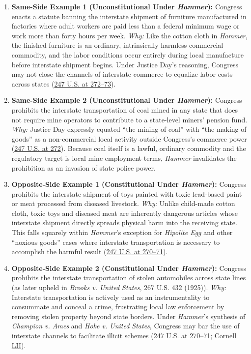 \documentclass[12pt]{article}
\begin{document}
\begin{enumerate}
\item \textbf{Same-Side Example 1 (Unconstitutional Under \textit{Hammer}):} Congress enacts a statute banning the interstate shipment of furniture manufactured in factories where adult workers are paid less than a federal minimum wage or work more than forty hours per week. \textit{Why:} Like the cotton cloth in \textit{Hammer}, the finished furniture is an ordinary, intrinsically harmless commercial commodity, and the labor conditions occur entirely during local manufacture before interstate shipment begins. Under Justice Day's reasoning, Congress may not close the channels of interstate commerce to equalize labor costs across states (\href{https://supreme.justia.com/cases/federal/us/247/251/}{247 U.S. at 272--73}).

\item \textbf{Same-Side Example 2 (Unconstitutional Under \textit{Hammer}):} Congress prohibits the interstate transportation of coal mined in any state that does not require mine operators to contribute to a state-level miners' pension fund. \textit{Why:} Justice Day expressly equated ``the mining of coal'' with ``the making of goods'' as a non-commercial local activity outside Congress's commerce power (\href{https://supreme.justia.com/cases/federal/us/247/251/}{247 U.S. at 272}). Because coal itself is a lawful, ordinary commodity and the regulatory target is local mine employment terms, \textit{Hammer} invalidates the prohibition as an invasion of state police power.

\item \textbf{Opposite-Side Example 1 (Constitutional Under \textit{Hammer}):} Congress prohibits the interstate shipment of toys painted with toxic lead-based paint or meat processed from diseased livestock. \textit{Why:} Unlike child-made cotton cloth, toxic toys and diseased meat are inherently dangerous articles whose interstate shipment directly spreads physical harm into the receiving state. This falls squarely within \textit{Hammer}'s exception for \textit{Hipolite Egg} and other ``noxious goods'' cases where interstate transportation is necessary to accomplish the harmful result (\href{https://supreme.justia.com/cases/federal/us/247/251/}{247 U.S. at 270--71}).

\item \textbf{Opposite-Side Example 2 (Constitutional Under \textit{Hammer}):} Congress prohibits the interstate transportation of stolen automobiles across state lines (as later upheld in \textit{Brooks v. United States}, 267 U.S. 432 (1925)). \textit{Why:} Interstate transportation is actively used as an instrumentality to consummate and conceal a crime, frustrating local law enforcement by removing stolen property beyond state borders. Under \textit{Hammer}'s synthesis of \textit{Champion v. Ames} and \textit{Hoke v. United States}, Congress may bar the use of interstate channels to facilitate illicit schemes (\href{https://supreme.justia.com/cases/federal/us/247/251/}{247 U.S. at 270--71}; \href{https://www.law.cornell.edu/constitution-conan/amendment-10/state-police-power-and-tenth-amendment-jurisprudence}{Cornell LII}).


\end{enumerate}
\end{document}
